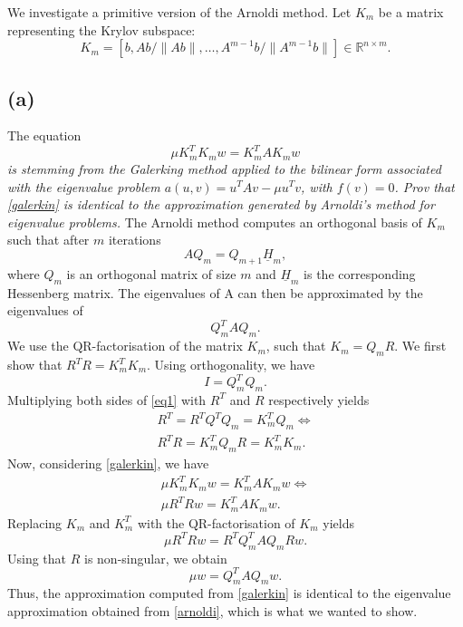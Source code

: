 We investigate a primitive version of the Arnoldi method. Let $K_m$ be a matrix representing the Krylov subspace:
\begin{equation}
K_m = [b, Ab/ \|Ab\|,\dots,A^{m-1}b/ \|A^{m-1}b\|]
\in\mathbb{R}^{n\times m}.
\end{equation}
\subsection{(a)}
The equation
\begin{equation}\label{galerkin}
\mu K_m^TK_mw = K_m^TAK_mw
\end{equation}
\emph{is stemming from the Galerking method applied to the bilinear form associated with the eigenvalue problem $a(u,v) = u^TAv-\mu u^Tv$, with $f(v) = 0$. Prov that \eqref{galerkin} is identical to the approximation generated by Arnoldi's method for eigenvalue problems.}
The Arnoldi method computes an orthogonal basis of $K_m$ such that after $m$ iterations
\begin{equation}
AQ_m = Q_{m+1}\underline{H}_{{m}},
\end{equation}
where $Q_m$ is an orthogonal matrix of size $m$ and $\underline{H}_{m}$ is the corresponding Hessenberg matrix. The eigenvalues of A can then be approximated by the eigenvalues of
\begin{equation}\label{arnoldi}
Q_m^TAQ_m.
\end{equation}
We use the QR-factorisation of the matrix $K_m$, such that $K_m = Q_mR$. We first show that $R^TR = K_m^TK_m$. Using orthogonality, we have
\begin{equation}\label{eq1}
I = Q^T_mQ_m.
\end{equation}
Multiplying both sides of \eqref{eq1} with $R^T$ and $R$ respectively yields
\begin{equation}
\begin{aligned}
R^T = R^TQ^TQ_m = K^T_mQ_m\Leftrightarrow\\
R^TR  = K^T_mQ_mR = K_m^TK_m.
\end{aligned}
\end{equation}
Now, considering \eqref{galerkin}, we have
\begin{equation}
\begin{aligned}
\mu K_m^TK_mw = K_m^TAK_mw\Leftrightarrow\\
\mu R^TRw = K_m^TAK_mw.
\end{aligned}
\end{equation}
Replacing $K_m$ and $K_m^T$ with the QR-factorisation of $K_m$ yields
\begin{equation}
\mu R^TRw = R^TQ_m^TAQ_mRw.
\end{equation}
Using that $R$ is non-singular, we obtain
\begin{equation}
\mu w = Q_m^TAQ_mw.
\end{equation}
Thus, the approximation computed from \eqref{galerkin} is identical to the eigenvalue approximation obtained from \eqref{arnoldi}, which is what we wanted to show.
